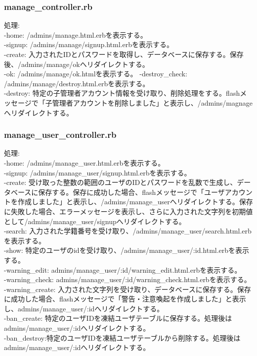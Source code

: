 \documentclass[a4j]{jarticle}
\begin{document}
\subsubsection{manage\_controller.rb}
\noindent
処理:  \\
-home: /admins/manage.html.erbを表示する。\\
-signup: /admins/manage/signup.html.erbを表示する。\\
-create: 入力されたIDとパスワードを取得し、データベースに保存する。保存後、/admins/manage/okへリダイレクトする。\\
-ok: /admins/manage/ok.htmlを表示する。
-destroy\_check: /admins/manage/destroy.html.erbを表示する。\\
-destroy: 特定の子管理者アカウント情報を受け取り、削除処理をする。flashメッセージで「子管理者アカウントを削除しました」と表示し、/admins/magnageへリダイレクトする。

\subsubsection{manage\_user\_controller.rb}
\noindent
処理:  \\
-home: /admins/manage\_user.html.erbを表示する。\\
-signup: /admins/manage\_user/signup.html.erbを表示する。\\
-create: 受け取った整数の範囲のユーザのIDとパスワードを乱数で生成し、データベースに保存する。保存に成功した場合、flashメッセージで「ユーザアカウントを作成しました」と表示し、/admins/manage\_userへリダイレクトする。保存に失敗した場合、エラーメッセージを表示し、さらに入力された文字列を初期値として/admins/manage\_user/signupへリダイレクトする。\\
-search: 入力された学籍番号を受け取り、/admins/manage\_user/search.html.erbを表示する。\\
-show: 特定のユーザのidを受け取り、/admins/manage\_user/:id.html.erbを表示する。\\
-warning\_edit: admins/manage\_user/:id/warning\_edit.html.erbを表示する。\\
-warning\_check: admins/manage\_user/:id/warning\_check.html.erbを表示する。\\
-warning\_create: 入力された文字列を受け取り、データベースに保存する。保存に成功した場合、flashメッセージで「警告・注意喚起を作成しました」と表示し、admins/manage\_user/:idへリダイレクトする。\\
-ban\_create: 特定のユーザIDを凍結ユーザテーブルに保存する。処理後はadmins/manage\_user/:idへリダイレクトする。\\
-ban\_destroy:特定のユーザIDを凍結ユーザテーブルから削除する。処理後はadmins/manage\_user/:idへリダイレクトする。
\end{document}
